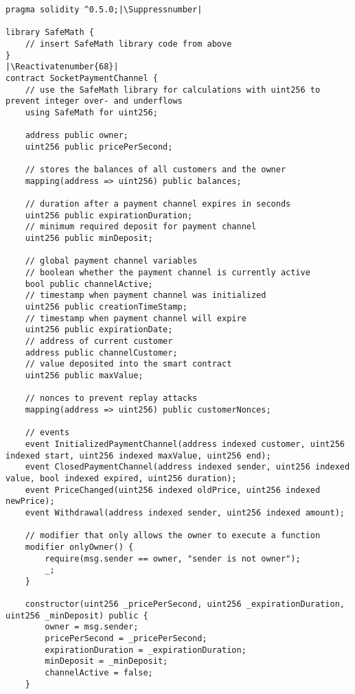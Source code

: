 \begin{lstlisting}[language=Solidity, caption={Payment Channel Smart Contract}, label={lis:pc_sc}]
pragma solidity ^0.5.0;|\Suppressnumber|

library SafeMath {
    // insert SafeMath library code from above
}
|\Reactivatenumber{68}|
contract SocketPaymentChannel {
    // use the SafeMath library for calculations with uint256 to prevent integer over- and underflows
    using SafeMath for uint256;

    address public owner;
    uint256 public pricePerSecond;

    // stores the balances of all customers and the owner
    mapping(address => uint256) public balances;

    // duration after a payment channel expires in seconds
    uint256 public expirationDuration;
    // minimum required deposit for payment channel
    uint256 public minDeposit;

    // global payment channel variables
    // boolean whether the payment channel is currently active
    bool public channelActive;
    // timestamp when payment channel was initialized
    uint256 public creationTimeStamp;
    // timestamp when payment channel will expire
    uint256 public expirationDate;
    // address of current customer
    address public channelCustomer;
    // value deposited into the smart contract
    uint256 public maxValue;

    // nonces to prevent replay attacks
    mapping(address => uint256) public customerNonces;

    // events
    event InitializedPaymentChannel(address indexed customer, uint256 indexed start, uint256 indexed maxValue, uint256 end);
    event ClosedPaymentChannel(address indexed sender, uint256 indexed value, bool indexed expired, uint256 duration);
    event PriceChanged(uint256 indexed oldPrice, uint256 indexed newPrice);
    event Withdrawal(address indexed sender, uint256 indexed amount);

    // modifier that only allows the owner to execute a function
    modifier onlyOwner() {
        require(msg.sender == owner, "sender is not owner");
        _;
    }

    constructor(uint256 _pricePerSecond, uint256 _expirationDuration, uint256 _minDeposit) public {
        owner = msg.sender;
        pricePerSecond = _pricePerSecond;
        expirationDuration = _expirationDuration;
        minDeposit = _minDeposit;
        channelActive = false;
    }


\end{lstlisting}
